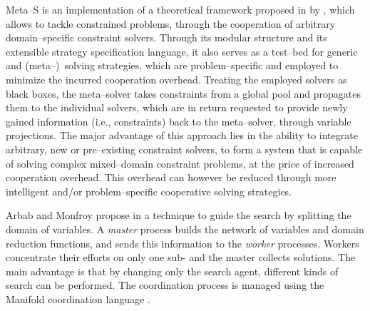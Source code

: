 {\sc Meta--S} is an implementation of a theoretical framework proposed in \cite{Frank2003} by , which allows to tackle constrained problems, through the cooperation of arbitrary domain--specific constraint solvers. Through its modular structure and its extensible strategy specification language, it also serves as a test--bed for generic and (meta--)~solving strategies, which are problem--specific and employed to minimize the incurred cooperation overhead. Treating the employed solvers as black boxes, the meta--solver takes constraints from a global pool and propagates them to the individual solvers, which are in return requested to provide newly gained information (i.e., constraints) back to the meta--solver, through variable projections. The major advantage of this approach lies in the ability to integrate arbitrary, new or pre--existing constraint solvers, to form a system that is capable of solving complex mixed--domain constraint problems, at the price of increased cooperation overhead. This overhead can however be reduced through more intelligent and/or problem--specific cooperative solving strategies. 



Arbab and Monfroy propose in \cite{Arbab2000} a technique to guide the search by splitting the domain of variables. A \textit{master} process builds the network of variables and domain reduction functions, and sends this information to the \textit{worker} processes. Workers concentrate their efforts on only one sub-\csp{} and the master collects solutions. The main advantage is that by changing only the search agent, different kinds of search can be performed. The coordination process is managed using the {\sc Manifold} coordination language \cite{Arbab1995}.

